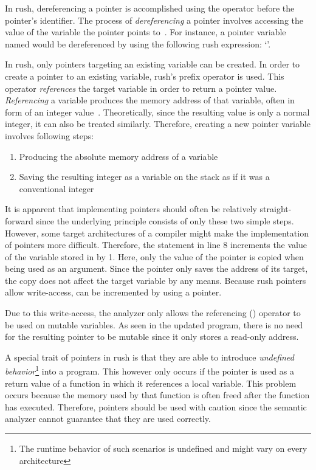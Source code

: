 In rush, dereferencing a pointer is accomplished using the \qVerb{*} operator before the pointer's identifier.
The process of \emph{dereferencing} a pointer involves accessing the value of the variable the pointer points to~\cite[p.~94]{Ritchie1988}.
For instance, a pointer variable named  would be dereferenced by using the following rush expression: `'.

In rush, only pointers targeting an existing variable can be created.
In order to create a pointer to an existing variable, rush's \qVerb{&} prefix operator is used.
This operator \emph{references} the target variable in order to return a pointer value.
\emph{Referencing} a variable produces the memory address of that variable, often in form of an integer value~\cite[p.~95]{Ritchie1988}.
Theoretically, since the resulting value is only a normal integer, it can also be treated similarly.
Therefore, creating a new pointer variable involves following steps:

\begin{enumerate}
	\item Producing the absolute memory address of a variable
	\item Saving the resulting integer as a variable on the stack as if it was a conventional integer
\end{enumerate}

It is apparent that implementing pointers should often be relatively straight-forward since the underlying principle consists of only these two simple steps.
However, some target architectures of a compiler might make the implementation of pointers more difficult.
Therefore, the statement in line 8 increments the value of the variable stored in  by 1.
Here, only the value of the pointer is copied when being used as an argument.
Since the pointer only saves the address of its target, the copy does not affect the target variable by any means.
Because rush pointers allow write-access,  can be incremented by using a pointer.

Due to this write-access, the analyzer only allows the referencing (\qVerb{&}) operator to be used on mutable variables.
As seen in the updated program, there is no need for the resulting pointer to be mutable since it only stores a read-only address.

A special trait of pointers in rush is that they are able to introduce \emph{undefined behavior}\footnote{The runtime behavior of such scenarios is undefined and might vary on every architecture} into a program.
This however only occurs if the pointer is used as a return value of a function in which it references a local variable.
This problem occurs because the memory used by that function is often freed after the function has executed.
Therefore, pointers should be used with caution since the semantic analyzer cannot guarantee that they are used correctly.

